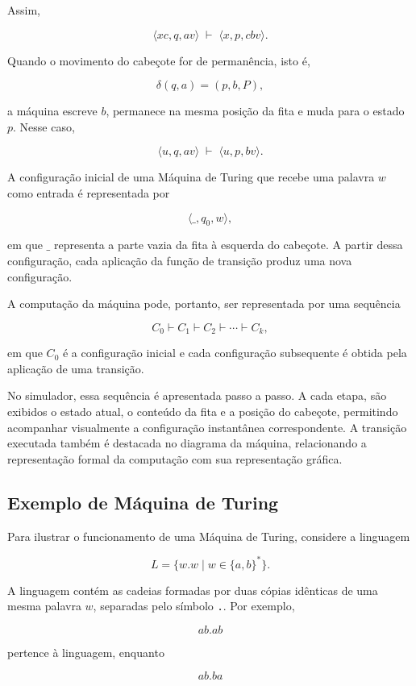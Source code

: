 \documentclass[
  brazilian,
  letterpaper,
]{book}
\theoremstyle{plain}
\theoremstyle{definition}
\theoremstyle{remark}
\begin{document}
Assim,

\[
\langle xc,q,av\rangle
\;\vdash\;
\langle x,p,cbv\rangle.
\]

Quando o movimento do cabeçote for de permanência, isto é,

\[
\delta(q,a)=(p,b,P),
\]

a máquina escreve \(b\), permanece na mesma posição da fita e muda para
o estado \(p\). Nesse caso,

\[
\langle u,q,av\rangle
\;\vdash\;
\langle u,p,bv\rangle.
\]

A configuração inicial de uma Máquina de Turing que recebe uma palavra
\(w\) como entrada é representada por

\[
\langle \_,q_0,w\rangle,
\]

em que \(\_\) representa a parte vazia da fita à esquerda do cabeçote. A
partir dessa configuração, cada aplicação da função de transição produz
uma nova configuração.

A computação da máquina pode, portanto, ser representada por uma
sequência

\[
C_0\vdash C_1\vdash C_2\vdash\cdots\vdash C_k,
\]

em que \(C_0\) é a configuração inicial e cada configuração subsequente
é obtida pela aplicação de uma transição.

No simulador, essa sequência é apresentada passo a passo. A cada etapa,
são exibidos o estado atual, o conteúdo da fita e a posição do cabeçote,
permitindo acompanhar visualmente a configuração instantânea
correspondente. A transição executada também é destacada no diagrama da
máquina, relacionando a representação formal da computação com sua
representação gráfica.

\subsection{Exemplo de Máquina de
Turing}\label{exemplo-de-muxe1quina-de-turing}

Para ilustrar o funcionamento de uma Máquina de Turing, considere a
linguagem

\[
L=\{w.w\mid w\in\{a,b\}^*\}.
\]

A linguagem contém as cadeias formadas por duas cópias idênticas de uma
mesma palavra \(w\), separadas pelo símbolo \texttt{.}. Por exemplo,

\[
ab.ab
\]

pertence à linguagem, enquanto

\[
ab.ba
\]
\end{document}
